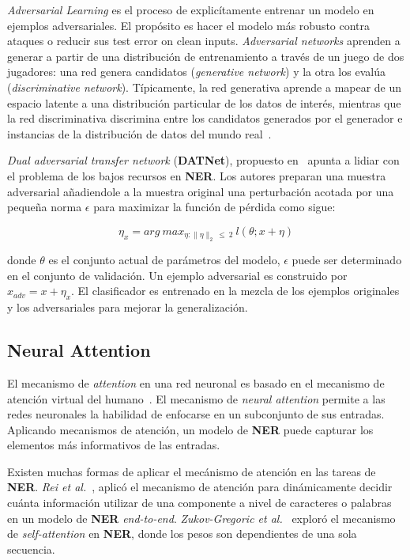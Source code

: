 \emph{Adversarial Learning} es el proceso de explic\'itamente entrenar un modelo en ejemplos adversariales. El prop\'osito es hacer el modelo m\'as robusto contra ataques o reducir sus test error on clean inputs. \emph{Adversarial networks} aprenden a generar a partir de una distribuci\'on de entrenamiento a trav\'es de un juego de dos jugadores: una red genera candidatos (\emph{generative network}) y la otra los eval\'ua (\emph{discriminative network}). T\'ipicamente, la red generativa aprende a mapear de un espacio latente a una distribuci\'on particular de los datos de inter\'es, mientras que la red discriminativa discrimina entre los candidatos generados por el generador e instancias de la distribuci\'on de datos del mundo real~\cite{goodfellow2014generative}.

\emph{Dual adversarial transfer network} (\textbf{DATNet}), propuesto en~\cite{zhou2018datnet} apunta a lidiar con el problema de los bajos recursos en \textbf{NER}. Los autores preparan una muestra adversarial a\~nadiendole a la muestra original una perturbaci\'on acotada por una peque\~na norma $\epsilon$ para maximizar la funci\'on de p\'erdida como sigue:

\begin{equation}
	\eta_x = arg \ max_{\eta:\lVert \eta \rVert_2 \ \leq \ 2 } \ l(\theta; x + \eta)
\end{equation}

donde $\theta$ es el conjunto actual de par\'ametros del modelo, $\epsilon$ puede ser determinado en el conjunto de validaci\'on. Un ejemplo adversarial es construido por $x_{adv} = x + \eta_x$. El clasificador es entrenado en la mezcla de los ejemplos originales y los adversariales para mejorar la generalizaci\'on.


\subsection{Neural Attention}

El mecanismo de \emph{attention} en una red neuronal es basado en el mecanismo de atenci\'on virtual del humano~\cite{britz2016attention}. El mecanismo de \emph{neural attention} permite a las redes neuronales la habilidad de enfocarse en un subconjunto de sus entradas. Aplicando mecanismos de atenci\'on, un modelo de \textbf{NER} puede capturar los elementos m\'as informativos de las entradas. 

Existen muchas formas de aplicar el mec\'anismo de atenci\'on en las tareas de \textbf{NER}. \emph{Rei et al.}~\cite{rei2016attending}, aplic\'o el mecanismo de atenci\'on para din\'amicamente decidir cu\'anta informaci\'on utilizar de una componente a nivel de caracteres o palabras en un modelo de \textbf{NER} \emph{end-to-end}. \emph{Zukov-Gregoric et al.}~\cite{zukov2017neural} explor\'o el mecanismo de \emph{self-attention} en \textbf{NER}, donde los pesos son dependientes de una sola secuencia.

